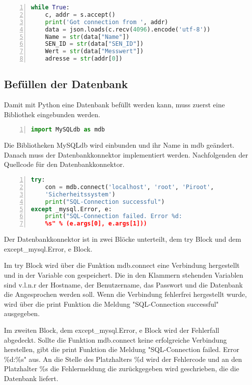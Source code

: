 \begin{lstlisting}[caption=Speichern der Daten,frame=single,numbers=left,language=Python]
while True:
	c, addr = s.accept()
	print('Got connection from ', addr)
	data = json.loads(c.recv(4096).encode('utf-8'))
	Name = str(data["Name"])
	SEN_ID = str(data["SEN_ID"])
	Wert = str(data["Messwert"])
	adresse = str(addr[0])
\end{lstlisting}
\label{Daten}
\subsection{Befüllen der Datenbank}
Damit mit Python eine Datenbank befüllt werden kann, muss zuerst eine Bibliothek eingebunden werden.
\begin{lstlisting}[caption=Einbinden der Bibliothek für die Datenbank,frame=single,numbers=left,language=Python]
import MySQLdb as mdb
\end{lstlisting}
Die Bibliotheken MySQLdb wird einbunden und ihr Name in mdb geändert.\hfill
\noindent Danach muss der Datenbankkonnektor implementiert werden. Nachfolgenden der Quellcode für den Datenbankkonnektor.
\begin{lstlisting}[caption=Datenbankkonnekor,frame=single,numbers=left,language=Python]
try:
	con = mdb.connect('localhost', 'root', 'Piroot',
	'Sicherheitssystem')
	print("SQL-Connection successful")
except _mysql.Error, e:
	print("SQL-Connection failed. Error %d:
	%s" % (e.args[0], e.args[1]))
\end{lstlisting}
Der Datenbankkonnektor ist in zwei Blöcke unterteilt, dem try Block und dem except\_mysql.Error, e Block.

\noindent Im try Block wird über die Funktion mdb.connect eine Verbindung hergestellt und in der Variable con \label{con} gespeichert. Die in den Klammern stehenden Variablen sind v.l.n.r der Hostname, der Benutzername, das Passwort und die Datenbank die Angesprochen werden soll. Wenn die Verbindung fehlerfrei hergestellt wurde, wird über die print Funktion die Meldung "SQL-Connection successful" ausgegeben.

\noindent Im zweiten Block, dem except\_mysql.Error, e Block wird der Fehlerfall abgedeckt. Sollte die Funktion mdb.connect keine erfolgreiche Verbindung herstellen, gibt die print Funktion die Meldung "SQL-Connection failed. Error \%d:\%s" aus. An die Stelle des Platzhalters \%d wird der Fehlercode und an den Platzhalter \%s die Fehlermeldung die zurückgegeben wird geschrieben, die die Datenbank liefert.

